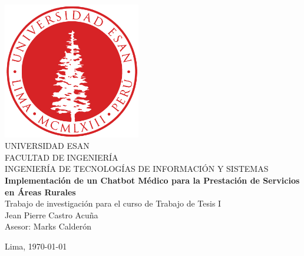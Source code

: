\documentclass[12pt,times]{report}
\numberwithin{equation}{chapter} %
\begin{document}
\begin{titlepage}

	\begin{center}
	    \includegraphics[width=0.45\textwidth]{images_repo/esanlogomin}
		\vspace*{2cm} \\
		UNIVERSIDAD ESAN \vspace*{1ex} \\
		FACULTAD DE INGENIERÍA \vspace*{1ex} \\
		INGENIERÍA DE TECNOLOGÍAS DE INFORMACIÓN Y SISTEMAS\vspace*{8ex} \\
		\textbf{Implementación de un Chatbot Médico para la Prestación de Servicios en Áreas Rurales}
		\vspace*{8ex}\\	
		Trabajo de investigación para el curso de Trabajo de Tesis I 
		\vspace*{8ex} \\	
		Jean Pierre Castro Acuña \\
		Asesor: Marks Calderón		
		\vfill
		
		Lima, \today 
		
	\end{center}
\end{titlepage}
\renewcommand{\listfigurename}{Índice de Figuras}
\renewcommand{\tablename}{Tabla}
\renewcommand{\listtablename}{Índice de Tablas}






\tableofcontents            %


\setcounter{secnumdepth}{3} %
\setcounter{tocdepth}{3}    %
\end{document}
